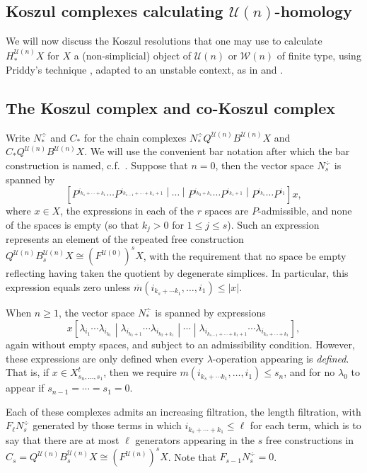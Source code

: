 \documentclass[11pt]{amsart} \renewcommand{\baselinestretch}{1.2}
\theoremstyle{plain}
\numberwithin{equation}{section} %
\theoremstyle{plain}
\numberwithin{equation}{chapter} %
\newcommand{\calU}{\mathcal{U}}
\newcommand{\calw}{\mathcal{W}}
\newcommand{\citeBOX}[2][]{\cite[\mbox{#1}]{#2}}
\newcommand{\minDimP}{\overline{m}}
\newcommand{\minDimDelta}{m}
\newcommand{\SectionOrChapter}[1]{\section{\textbf{#1}}}
\newcommand{\SubsectionOrSection}[1]{\subsection{#1}}
\begin{document}
\begin{Koszul complexes}

\SectionOrChapter{Koszul complexes calculating $\calU(n)$-homology}
\label{Koszul Cx section}\label{Koszul complexes}
We will now discuss the Koszul resolutions that one may use to calculate $H_*^{\calU(n)}X$ for $X$ a (non-simplicial)  object of $\calU(n)$ or $\calw(n)$ of finite type, using Priddy's technique \cite{PriddyKoszul.pdf}, adapted to an unstable context, as in \cite{CurtisSimplicialHtpy.pdf} and \cite[Chapter V]{MR1089001}.

\SubsectionOrSection{The Koszul complex and co-Koszul complex}
\label{The Koszul complex and co-Koszul complex}
Write $N_*^\div $ and $C_*$ for the chain complexes $N_*^\div Q^{\calU(n)}B^{\calU(n)}X$ and $C_* Q^{\calU(n)}B^{\calU(n)}X$.  We will use the convenient bar notation after which the bar construction is named, c.f.\ \citeBOX[\S7]{grpsHPin.pdf}. Suppose that $n=0$, then the vector space  $N_s^\div$ is spanned by
\[\left[P^{i_{k_s+\cdots +k_1}}\cdots P^{i_{k_{s-1}+\cdots +k_1+1}}
\middle|\cdots 
\middle|P^{i_{k_2+k_1}}\cdots P^{i_{k_1+1}}
\middle|P^{i_{k_1}}\cdots P^{i_1}\right]
x,\]
where $x\in X$, the expressions in each of the $r$ spaces are $P$-admissible, and none of the spaces is empty (so that $k_j>0$ for $1\leq j\leq s$). Such an expression represents an element of the repeated free construction $Q^{\calU(n)}B^{\calU(n)}_sX\cong (F^{\calU(0)})^{s}X$, with the requirement that no space be empty reflecting having taken the quotient by degenerate simplices. In particular, this expression equals zero unless $\minDimP(i_{k_s+\cdots k_1},\ldots,i_1)\leq |x|$.

When $n\geq1$, the vector space $N_*^\div$ is spanned by expressions \[x\left[\lambda_{i_1}\cdots \lambda_{i_{k_1}} 
\middle|\lambda_{i_{k_1+1}}\cdots \lambda_{i_{k_2+k_1}}
\middle|\cdots\middle|\lambda_{i_{k_{s-1}+\cdots +k_1+1}}\cdots \lambda_{i_{k_s+\cdots +k_1}}\right],
\]
again without empty spaces, and subject to an admissibility condition. However, these expressions are only defined when every $\lambda$-operation appearing is \emph{defined}. That is, if $x\in X^{t}_{s_n,\ldots,s_1}$, then we require $\minDimDelta(i_{k_s+\cdots k_1},\ldots,i_1)\leq s_n$, and for no $\lambda_0$ to appear if $s_{n-1}=\cdots =s_1=0$.

Each of these complexes admits an increasing filtration, the length filtration, with $F_\ell N^\div_s$ generated by those terms in which $i_{k_s+\cdots +k_1}\leq \ell$ for each term, which is to say that there are at most $\ell$ generators appearing in the $s$ free constructions in $C_s= Q^{\calU(n)}B^{\calU(n)}_sX\cong (F^{\calU(n)})^sX$. Note that $F_{s-1}N^\div_s=0$. %


\end{Koszul complexes}
\end{document}
